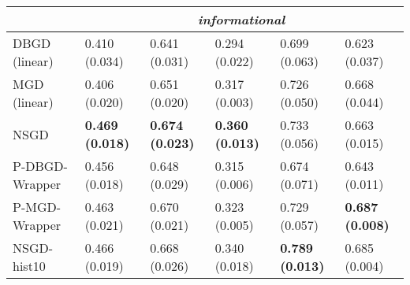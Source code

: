 \begin{tabular*}{\textwidth}{@{\extracolsep{\fill} } l  l l l l l  }
\midrule
& \multicolumn{5}{|c|}{\textit{informational}} \\
\midrule
DBGD (linear) & 0.410 {\tiny (0.034)} & 0.641 {\tiny (0.031)} & 0.294 {\tiny (0.022)} & 0.699 {\tiny (0.063)} & 0.623 {\tiny (0.037)} \\
MGD (linear) & 0.406 {\tiny (0.020)} & 0.651 {\tiny (0.020)} & 0.317 {\tiny (0.003)} & 0.726 {\tiny (0.050)} & 0.668 {\tiny (0.044)} \\
NSGD & \bf 0.469 {\tiny (0.018)} & \bf 0.674 {\tiny (0.023)} & \bf 0.360 {\tiny (0.013)} & 0.733 {\tiny (0.056)} & 0.663 {\tiny (0.015)} \\
P-DBGD-Wrapper & 0.456 {\tiny (0.018)}  & 0.648 {\tiny (0.029)}  & 0.315 {\tiny (0.006)}  & 0.674 {\tiny (0.071)}  & 0.643 {\tiny (0.011)}  \\
P-MGD-Wrapper & 0.463 {\tiny (0.021)}  & 0.670 {\tiny (0.021)}  & 0.323 {\tiny (0.005)}  & 0.729 {\tiny (0.057)}  & \bf 0.687 {\tiny (0.008)}  \\
NSGD-hist10 & 0.466 {\tiny (0.019)}  & 0.668 {\tiny (0.026)}  & 0.340 {\tiny (0.018)} & \bf 0.789 {\tiny (0.013)}  & 0.685 {\tiny (0.004)} \\
\bottomrule
\end{tabular*}
